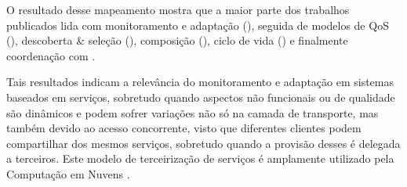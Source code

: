O resultado desse mapeamento mostra que a maior parte dos trabalhos publicados lida com monitoramento e adapta\c{c}\~{a}o (\MonitoramentoAdaptacao), seguida de modelos de QoS (\ModelosdeQoSeLinguagens), descoberta \& sele\c{c}\~{a}o (\DescobrimentoSelecao),  composi\c{c}\~{a}o (\Composicao), ciclo de vida (\Ciclodevida) e finalmente coordenação com \CoodenacaoComunicacao.

Tais resultados indicam a relevância do monitoramento e adaptação em sistemas baseados em serviços, sobretudo quando aspectos não funcionais ou de qualidade são dinâmicos e podem sofrer variações não só na camada de transporte, mas também devido ao acesso concorrente, visto que diferentes clientes podem compartilhar dos mesmos serviços, sobretudo quando a provisão desses é delegada a terceiros. Este modelo de terceirização de serviços é amplamente utilizado pela Computação em Nuvens \cite{}.

